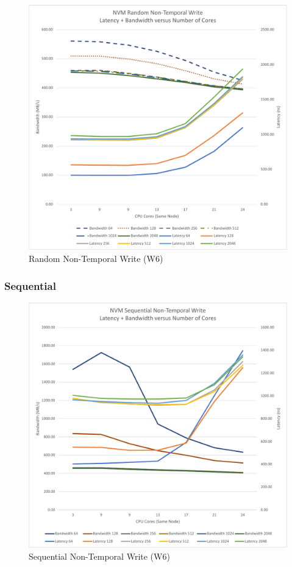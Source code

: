 \begin{figure}
    \centering
    \caption{Random Non-Temporal Write (W6)}\label{chart:random:w6}
    \includegraphics[scale=0.5]{charts/random-w6-crop.pdf}
\end{figure}

\subsubsection{Sequential}

\begin{figure}
    \centering
    \caption{Sequential Non-Temporal Write (W6)}\label{chart:sequential:W6}
    \includegraphics[scale=0.5]{charts/sequential-w6-crop.pdf}
\end{figure}


